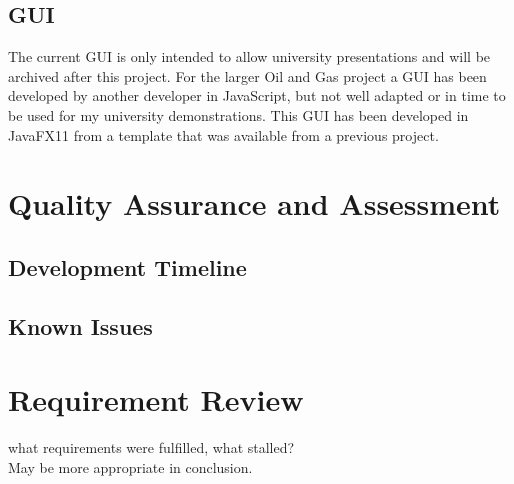 \documentclass[main.tex]{subfiles}
\begin{document}
    \subsection{GUI}
      
      The current GUI is only intended to allow university presentations and will be archived after this project. For the larger Oil and Gas project a GUI has been developed by another developer in JavaScript, but not well adapted or in time to be used for my university demonstrations. This GUI has been developed in JavaFX11 from a template that was available from a previous project.
    
  \section{Quality Assurance and Assessment}
     
     \subsection{Development Timeline}
     \subsection{Known Issues}
      
  \section{Requirement Review}
    what requirements were fulfilled, what stalled?\\
    May be more appropriate in conclusion.
  
\end{document}
